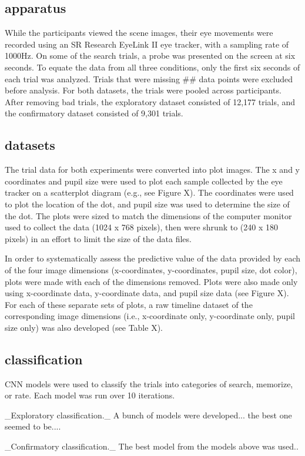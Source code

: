\subsection{apparatus}
While the participants viewed the scene images, their eye movements were recorded using an SR Research EyeLink II eye tracker, with a sampling rate of 1000Hz. On some of the search trials, a probe was presented on the screen at six seconds. To equate the data from all three conditions, only the first six seconds of each trial was analyzed. Trials that were missing ## data points were excluded before analysis. For both datasets, the trials were pooled across participants. After removing bad trials, the exploratory dataset consisted of 12,177 trials, and the confirmatory dataset consisted of 9,301 trials.

\subsection{datasets}
The trial data for both experiments were converted into plot images. The x and y coordinates and pupil size were used to plot each sample collected by the eye tracker on a scatterplot diagram (e.g., see Figure X). The coordinates were used to plot the location of the dot, and pupil size was used to determine the size of the dot. The plots were sized to match the dimensions of the computer monitor used to collect the data (1024 x 768 pixels), then were shrunk to (240 x 180 pixels) in an effort to limit the size of the data files.


In order to systematically assess the predictive value of the data provided by each of the four image dimensions (x-coordinates, y-coordinates, pupil size, dot color), plots were made with each of the dimensions removed. Plots were also made only using x-coordinate data, y-coordinate data, and pupil size data (see Figure X). For each of these separate sets of plots, a raw timeline dataset of the corresponding image dimensions (i.e., x-coordinate only, y-coordinate only, pupil size only) was also developed (see Table X).


\subsection{classification}
CNN models were used to classify the trials into categories of search, memorize, or rate. Each model was run over 10 iterations.

_Exploratory classification._ A bunch of models were developed... the best one seemed to be....


_Confirmatory classification._ The best model from the models above was used..
